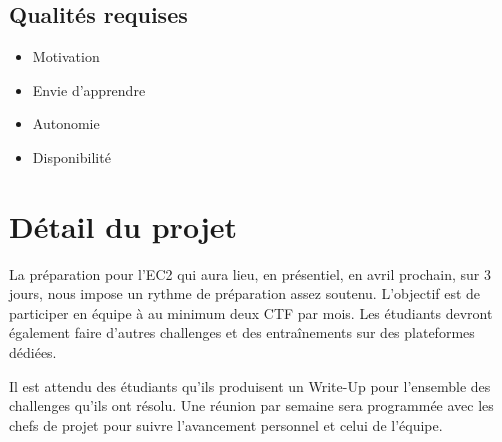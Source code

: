 \documentclass[12pt]{article}
\begin{document}
	\subsection{Qualités requises}
	\begin{itemize}
		\item Motivation
		\item Envie d'apprendre
        \item Autonomie
		\item Disponibilité
	\end{itemize}

    \section{Détail du projet}
    La préparation pour l'EC2 qui aura lieu, en présentiel, en avril prochain, sur 3 jours, nous impose un rythme de préparation assez soutenu.
    L'objectif est de participer en équipe à au minimum deux CTF par mois. Les étudiants devront également faire d'autres challenges et des entraînements sur des plateformes dédiées.
    
    Il est attendu des étudiants qu'ils produisent un Write-Up pour l'ensemble des challenges qu'ils ont résolu.
    Une réunion par semaine sera programmée avec les chefs de projet pour suivre l'avancement personnel et celui de l'équipe.
\end{document}
